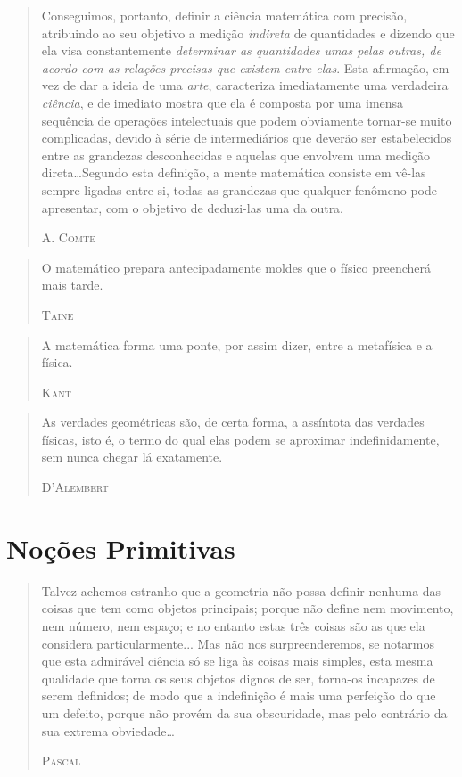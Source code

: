 \documentclass{hipatia}
\begin{document}
 
\begin{quote}
Conseguimos, portanto, definir a ciência matemática com precisão, atribuindo ao seu objetivo a medição \emph{indireta} de quantidades e dizendo que ela visa constantemente \emph{determinar as quantidades umas pelas outras, de acordo com as relações precisas que existem entre elas}. Esta afirmação, em vez de dar a ideia de uma \emph{arte}, caracteriza imediatamente uma verdadeira \emph{ciência}, e de imediato mostra que ela é composta por uma imensa sequência de operações intelectuais que podem obviamente tornar-se muito complicadas, devido à série de intermediários que deverão ser estabelecidos entre as grandezas desconhecidas e aquelas que envolvem uma medição direta\dots  Segundo esta definição, a mente matemática consiste em vê-las sempre ligadas entre si, todas as grandezas que qualquer fenômeno pode apresentar, com o objetivo de deduzi-las uma da outra.

\hfill \textsc{A. Comte}
\end{quote}

\begin{quote}
O matemático prepara antecipadamente moldes que o físico preencherá mais tarde.

\hfill \textsc{Taine}
\end{quote}
 

\begin{quote}
A matemática forma uma ponte, por assim dizer, entre a metafísica e a física.

\hfill \textsc{Kant}
\end{quote}

 
\begin{quote}
As verdades geométricas são, de certa forma, a assíntota das verdades físicas, isto é, o termo do qual elas podem se aproximar indefinidamente, sem nunca chegar lá exatamente.

\hfill \textsc{D'Alembert}
\end{quote}


\section{Noções Primitivas}

\begin{quote}
Talvez achemos estranho que a geometria não possa definir nenhuma das coisas que tem como objetos principais; porque não define nem movimento, nem número, nem espaço; e no entanto estas três coisas são as que ela considera particularmente... Mas não nos surpreenderemos, se notarmos que esta admirável ciência só se liga às coisas mais simples, esta mesma qualidade que torna os seus objetos dignos de ser, torna-os incapazes de serem definidos; de modo que a indefinição é mais uma perfeição do que um defeito, porque não provém da sua obscuridade, mas pelo contrário da sua extrema obviedade\dots

\hfill \textsc{Pascal}
\end{quote}
\end{document}
